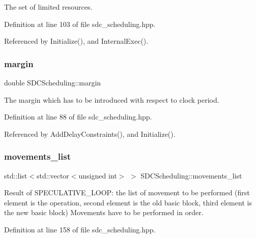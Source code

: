 The set of limited resources. 



Definition at line 103 of file sdc\+\_\+scheduling.\+hpp.



Referenced by Initialize(), and Internal\+Exec().

\mbox{\label{classSDCScheduling_aee3e9b8bbe23ac358ba87fa4ae58c91a}} 
\subsubsection{\texorpdfstring{margin}{margin}}
{\footnotesize\ttfamily double S\+D\+C\+Scheduling\+::margin\hspace{0.3cm}{\ttfamily [protected]}}



The margin which has to be introduced with respect to clock period. 



Definition at line 88 of file sdc\+\_\+scheduling.\+hpp.



Referenced by Add\+Delay\+Constraints(), and Initialize().

\mbox{\label{classSDCScheduling_a3f80309c4288473c20955008832e39cf}} 
\subsubsection{\texorpdfstring{movements\+\_\+list}{movements\_list}}
{\footnotesize\ttfamily std\+::list$<$std\+::vector$<$unsigned int$>$ $>$ S\+D\+C\+Scheduling\+::movements\+\_\+list}



Result of S\+P\+E\+C\+U\+L\+A\+T\+I\+V\+E\+\_\+\+L\+O\+OP\+: the list of movement to be performed (first element is the operation, second element is the old basic block, third element is the new basic block) Movements have to be performed in order. 



Definition at line 158 of file sdc\+\_\+scheduling.\+hpp.



